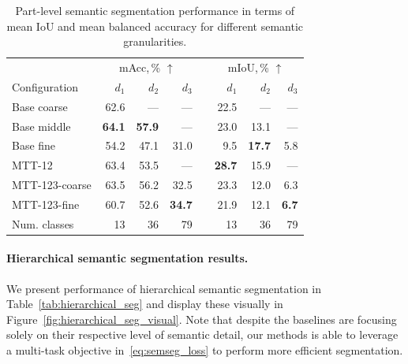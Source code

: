 \begin{table}[!h]

\caption{Part-level semantic segmentation performance in terms of mean IoU and mean balanced accuracy for different semantic granularities.}
\centering
\begin{tabular}{l rrr rrrr}
\toprule
 & \multicolumn{3}{c}{mAcc,\,\% $\uparrow$} && \multicolumn{3}{c}{mIoU,\,\% $\uparrow$} \\
\cmidrule{2-4}
\cmidrule{6-8}
Configuration   & $d_1$ & $d_2$ & $d_3$ && $d_1$ & $d_2$ & $d_3$ \\
\midrule
Base coarse     &  62.6 & ---   & ---   &&  22.5 & ---   & ---   \\
Base middle     &  \textbf{64.1} &  \textbf{57.9} & ---   &&  23.0 &  13.1 & ---   \\
Base fine       &  54.2 &  47.1 &  31.0 &&   9.5 &  \textbf{17.7} &   5.8 \\
\midrule
MTT-12          &  63.4 &  53.5 & ---   &&  \textbf{28.7} &  15.9 & ---   \\
MTT-123-coarse  &  63.5 &  56.2 &  32.5 &&  23.3 &  12.0 &   6.3 \\
MTT-123-fine    &  60.7 &  52.6 &  \textbf{34.7} &&  21.9 &  12.1 &   \textbf{6.7} \\
\midrule
Num. classes    &    13 &    36 &    79 &&    13 &    36 &    79 \\
\bottomrule
\end{tabular}
\label{tab:semseg}

\end{table}

\paragraph{Hierarchical semantic segmentation results. }
\label{results:hierarhical}
We present performance of hierarchical semantic segmentation in Table~\ref{tab:hierarchical_seg} and display these visually in Figure~\ref{fig:hierarchical_seg_visual}. Note that despite the baselines are focusing solely on their respective level of semantic detail, our methods is able to leverage a multi-task objective in~\eqref{eq:semseg_loss} to perform more efficient segmentation.

